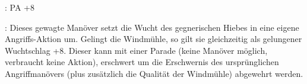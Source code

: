 {\sffamily\color{black}
\item[Probe]: PA +8}

{\sffamily\color{black}
\item[Wirkung]: Dieses gewagte Manöver setzt die Wucht
des gegnerischen Hiebes in eine eigene Angriffs-Aktion um. Gelingt die
Windmühle, so gilt sie gleichzeitig als gelungener Wuchtschlag +8.
Dieser kann mit einer Parade (keine Manöver möglich, verbraucht keine
Aktion), erschwert um die Erschwernis des ursprünglichen
Angriffmanövers (plus zusätzlich die Qualität der Windmühle) abgewehrt
werden.}
